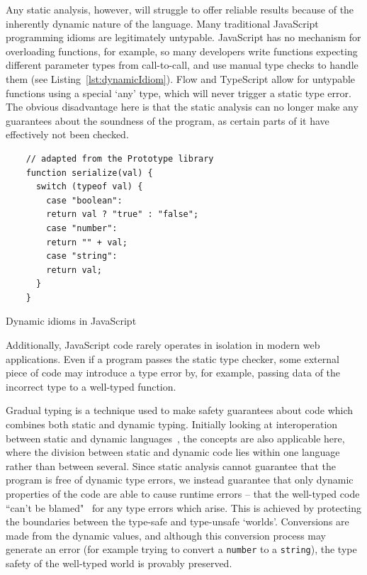 \documentclass[12pt,a4paper,twoside,openright]{report}
\theoremstyle{definition}
\theoremstyle{dotless}
\begin{document}
Any static analysis, however, will struggle to offer reliable results because
of the inherently dynamic nature of the language. Many traditional JavaScript
programming idioms are legitimately untypable. JavaScript has no
mechanism for overloading functions, for example, so many developers write
functions expecting different parameter types from call-to-call, and use manual
type checks to handle them (see Listing~\ref{lst:dynamicIdiom}). Flow and
TypeScript allow for untypable functions using a special `any' type, which will
never trigger a static type error. The obvious disadvantage here is that the
static analysis can no longer make any guarantees about the soundness of the
program, as certain parts of it have effectively not been checked.
\begin{program}[t]
  \begin{verbatim}
 	// adapted from the Prototype library
 	function serialize(val) {
	  switch (typeof val) {
		case "boolean":
		return val ? "true" : "false";
		case "number":
		return "" + val;
		case "string":
		return val;
	  }
 	}	
  \end{verbatim}
  \caption{Dynamic idioms in JavaScript}
  \label{lst:dynamicIdiom}
\end{program}
Additionally, JavaScript code rarely operates in isolation in modern web
applications. Even if a program passes the static type checker, some external
piece of code may introduce a type error by, for example, passing data of the
incorrect type to a well-typed function.

Gradual typing is a technique used to make safety guarantees about code which
combines both static and dynamic typing. Initially looking at interoperation
between static and dynamic languages~\cite{gray2005fine}, the concepts are
also applicable here, where the division between static and dynamic code lies
within one language rather than between several. Since static analysis cannot
guarantee that the program is free of dynamic type errors, we instead
guarantee that only dynamic properties of the code are able to cause runtime
errors -- that the well-typed code ``can't be blamed"~\cite{cantblame} for
any type errors which arise. This is achieved by protecting the boundaries
between the type-safe and type-unsafe `worlds'. Conversions are made from the
dynamic values, and although this conversion process may
generate an error (for example trying to convert a \texttt{number} to a
\texttt{string}), the type safety of the well-typed world is provably
preserved.
\end{document}
